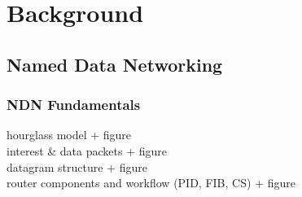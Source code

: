 \chapter{Background} \label{chapter:Background}



\section{Named Data Networking}

\subsection{NDN Fundamentals}

hourglass model + figure \\
interest \& data packets + figure \\
datagram structure + figure \\
router components and workflow (PID, FIB, CS) + figure \\

